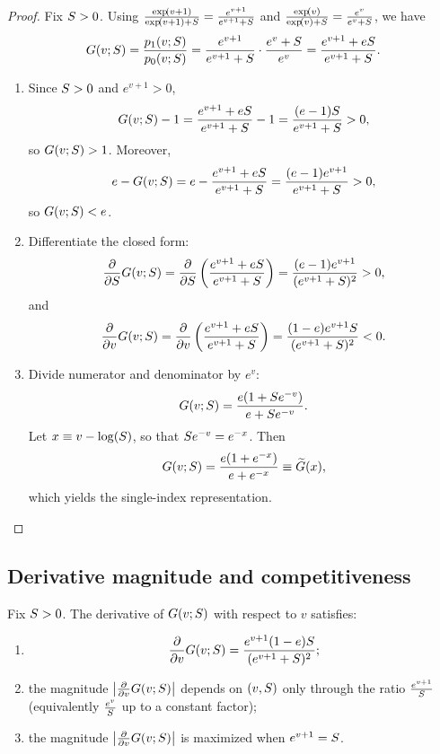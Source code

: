 \begin{proof}
Fix $S > 0$. Using $\frac{\exp\!\left(v+1\right)}{\exp\!\left(v+1\right)+S}=\frac{e^{v+1}}{e^{v+1}+S}$ and
$\frac{\exp\!\left(v\right)}{\exp\!\left(v\right)+S}=\frac{e^{v}}{e^{v}+S}$, we have
\[
    G\!\left(v;S\right)
    =\frac{p_{1}\!\left(v;S\right)}{p_{0}\!\left(v;S\right)}
    =\frac{e^{v+1}}{e^{v+1}+S}\cdot\frac{e^{v}+S}{e^{v}}
    =\frac{e^{v+1}+eS}{e^{v+1}+S}.
\]
\begin{enumerate}
    \item Since $S>0$ and $e^{v+1}>0$,
    \[
        G\!\left(v;S\right)-1
        =\frac{e^{v+1}+eS}{e^{v+1}+S}-1
        =\frac{(e-1)S}{e^{v+1}+S}>0,
    \]
    so $G\!\left(v;S\right)>1$. Moreover,
    \[
        e-G\!\left(v;S\right)
        =e-\frac{e^{v+1}+eS}{e^{v+1}+S}
        =\frac{(e-1)e^{v+1}}{e^{v+1}+S}>0,
    \]
    so $G\!\left(v;S\right)<e$.
    \item Differentiate the closed form:
    \[
        \frac{\partial}{\partial S}G\!\left(v;S\right)
        =\frac{\partial}{\partial S}\left(\frac{e^{v+1}+eS}{e^{v+1}+S}\right)
        =\frac{(e-1)e^{v+1}}{(e^{v+1}+S)^2}>0,
    \]
    and
    \[
        \frac{\partial}{\partial v}G\!\left(v;S\right)
        =\frac{\partial}{\partial v}\left(\frac{e^{v+1}+eS}{e^{v+1}+S}\right)
        =\frac{(1-e)e^{v+1}S}{(e^{v+1}+S)^2}<0.
    \]
    \item Divide numerator and denominator by $e^v$:
    \[
        G\!\left(v;S\right) = \frac{e(1+S e^{-v})}{e+S e^{-v}}.
    \]
    Let $x\equiv v-\log\!\left(S\right)$, so that $S e^{-v}=e^{-x}$. Then
    \[
        G\!\left(v;S\right)=\frac{e(1+e^{-x})}{e+e^{-x}} \equiv \widetilde G(x),
    \]
    which yields the single-index representation.
\end{enumerate}
\end{proof}

\subsection{Derivative magnitude and competitiveness}

\begin{lemma}\label{lem:Gderiv}
Fix $S > 0$. The derivative of $G\!\left(v;S\right)$ with respect to $v$ satisfies:
\begin{enumerate}
    \item
    \[
        \frac{\partial}{\partial v}G\!\left(v;S\right)
        = \frac{e^{v+1}(1-e)S}{(e^{v+1}+S)^2};
    \]
    \item the magnitude $\left|\frac{\partial}{\partial v}G\!\left(v;S\right)\right|$ depends on $(v,S)$ only through the ratio $\frac{e^{v+1}}{S}$ (equivalently $\frac{e^v}{S}$ up to a constant factor);
    \item the magnitude $\left|\frac{\partial}{\partial v}G\!\left(v;S\right)\right|$ is maximized when $e^{v+1} = S$.
\end{enumerate}
\end{lemma}


